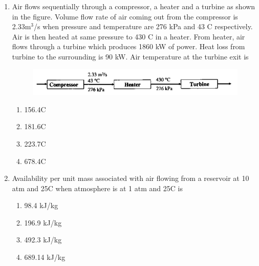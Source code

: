 \documentclass[a4paper,10pt]{article}
\begin{document}
\begin{enumerate}
\begin{multicols}{4}
\begin{enumerate}
\item 105.1 kPa
\item 108.3 kPa
\item 112.4 kPa
\item 119.7 kPa
\end{enumerate}
\end{multicols}

\item Air  flows sequentially through a compressor, a heater and a turbine as shown in the figure. Volume flow rate of air coming out from the compressor is 2.33m$^3$/s when pressure and temperature are 276 kPa and 43 \degree C respectively. Air is then heated at same pressure to 430 \degree C in a heater. From heater, air flows through a turbine which produces 1860 kW of power. Heat loss from turbine to the surrounding is 90 kW. Air temperature at the turbine exit is
\begin{figure}[H]
    \centering
    \includegraphics[width=1\columnwidth]{Eq12.png}
    \caption*{}
    \label{fig:q12_thermo}
\end{figure}
\hfill{}

\begin{multicols}{4}
\begin{enumerate}
\item 156.4\degree C
\item 181.6\degree C
\item 223.7\degree C
\item 678.4\degree C
\end{enumerate}
\end{multicols}

\item Availability per unit mass associated with air  flowing from a reservoir at 10 atm and 25\degree C when atmosphere is at 1 atm and 25\degree C is 
\hfill{}

\begin{multicols}{4}
\begin{enumerate}
\item 98.4 kJ/kg
\item 196.9 kJ/kg
\item 492.3 kJ/kg
\item 689.14 kJ/kg
\end{enumerate}
\end{multicols}


\end{enumerate}
\end{document}
